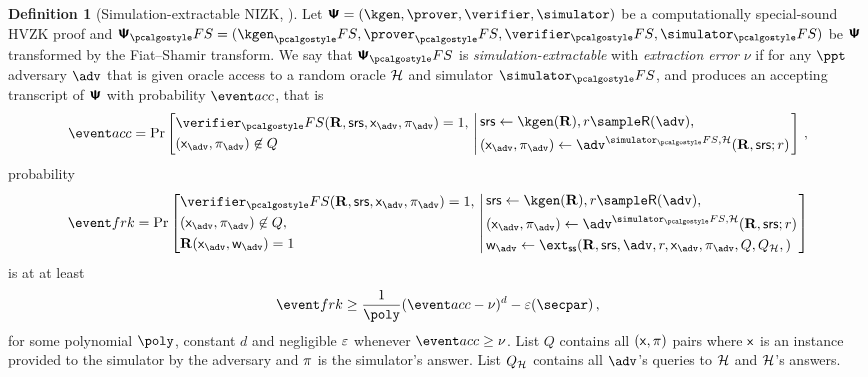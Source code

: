\documentclass[runningheads,11pt]{llncs}
\theoremstyle{definition} \newtheorem{definition}[theorem]{Definition}
\begin{document}
\begin{definition}[Simulation-extractable NIZK, \cite{INDOCRYPT:FKMV12}]
	\label{def:simext}
	Let $\ps = (\kgen, \prover, \verifier, \simulator)$ be a computationally
  special-sound HVZK proof and $\ps_\fs = (\kgen_\fs, \prover_\fs,
  \verifier_\fs, \simulator_\fs)$ be $\bm{\mathsf{\Psi}}$ transformed by the Fiat--Shamir
  transform. We say that $\ps_\fs$ is \emph{simulation-extractable} with
  \emph{extraction error} $\nu$ if for any $\ppt$ adversary $\adv$ that is given
  oracle access to a random oracle $\mathcal{H}$ and simulator $\simulator_\fs$, and
  produces an accepting transcript of $\bm{\mathsf{\Psi}}$ with probability $\accProb$, that is
	\[
		\accProb = \Pr \left[
		\begin{aligned}
			& \verifier_\fs(\REL, \srs, \inp_{\advse}, \zkproof_{\advse}) = 1,\\
			& (\inp_{\advse}, \zkproof_{\advse}) \not\in Q
		\end{aligned}
		\, \left| \,
		\begin{aligned}
			& \srs \gets \kgen(\REL), r \sample \RND{\advse}, \\
			& (\inp_{\advse}, \zkproof_{\advse}) \gets \advse^{\simulator_\fs,
			\ro} (\REL, \srs; r) 
		\end{aligned}
		\right.\right]\,,
	\]
	probability
	\[
		\frkProb = \Pr \left[
		\begin{aligned}
			& \verifier_\fs(\REL, \srs, \inp_{\advse}, \zkproof_{\advse}) = 1,\\
			& (\inp_{\advse}, \zkproof_{\advse}) \not\in Q,\\
			& \REL(\inp_{\advse}, \wit_{\advse}) = 1
		\end{aligned}
		\, \left| \,
		\begin{aligned}
			& \srs \gets \kgen(\REL), r \sample \RND{\advse},\\
			& (\inp_{\advse}, \zkproof_{\advse}) \gets \advse^{\simulator_\fs,
			\ro} (\REL, \srs; r) \\
			& \wit_{\advse} \gets \ext_\ss (\REL, \srs, \advse, r, \inp_{\advse}, \zkproof_{\advse},
			Q, Q_\ro,) 
		\end{aligned}
		\right.\right]
	\]
	is at at least 
	\[
		\frkProb \geq \frac{1}{\poly} (\accProb - \nu)^d - \eps(\secpar)\,,
	\]
	for some polynomial $\poly$, constant $d$ and negligible $\varepsilon$ whenever
  $\accProb \geq \nu$. List $Q$ contains all $(\mathsf{x}, \pi)$ pairs where
  $\mathsf{x}$ is an instance provided to the simulator by the adversary and
  $\pi$ is the simulator's answer. List $Q_{\mathcal{H}}$ contains all $\advse$'s
  queries to $\mathcal{H}$ and $\mathcal{H}$'s answers.
\end{definition}
\end{document}
